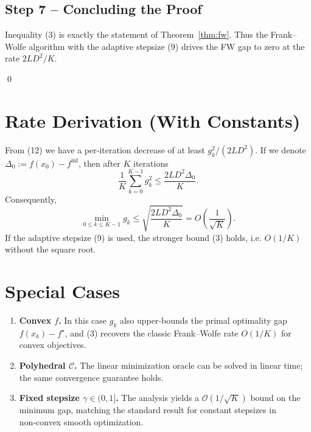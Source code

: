 \documentclass{article}
\begin{document}
\subsection*{Step 7 – Concluding the Proof}
Inequality (3) is exactly the statement of Theorem~\ref{thm:fw}.
Thus the Frank–Wolfe algorithm with the adaptive stepsize (9) drives the
FW gap to zero at the rate $2L D^{2}/K$.

\qed

\section*{Rate Derivation (With Constants)}
From (12) we have a per‑iteration decrease of at least $g_k^{2}/(2 L D^{2})$.
If we denote $\Delta_0:=f(x_0)-f^{\inf}$, then after $K$ iterations
\[
\frac{1}{K}\sum_{k=0}^{K-1} g_k^{2}
   \le \frac{2 L D^{2}\Delta_0}{K}.
\]
Consequently,
\[
\min_{0\le k\le K-1} g_k
   \le \sqrt{\frac{2 L D^{2}\Delta_0}{K}}
   = O\!\left(\frac{1}{\sqrt{K}}\right).
\]
If the adaptive stepsize (9) is used, the stronger bound (3) holds,
i.e. $O(1/K)$ without the square root.

\section*{Special Cases}
\begin{enumerate}[label=\alph*)]
\item \textbf{Convex $f$.} In this case $g_k$ also upper‑bounds the primal
optimality gap $f(x_k)-f^{\star}$, and (3) recovers the classic Frank–Wolfe
rate $O(1/K)$ for convex objectives.
\item \textbf{Polyhedral $\mathcal{C}$.} The linear minimization oracle can be
solved in linear time; the same convergence guarantee holds.
\item \textbf{Fixed stepsize $\gamma\in(0,1]$.} The analysis yields a
$\mathcal{O}(1/\sqrt{K})$ bound on the minimum gap, matching the standard
result for constant stepsizes in non‑convex smooth optimization.
\end{enumerate}
\end{document}
